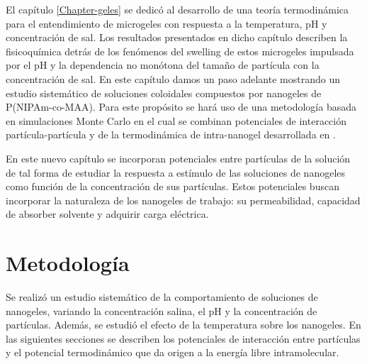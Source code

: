 	El cap\'itulo \ref{Chapter-geles} se dedic\'o al desarrollo de una teor\'ia termodin\'amica para el entendimiento de microgeles con respuesta a la temperatura, pH y concentraci\'on de sal. Los resultados presentados en dicho cap\'itulo describen la fisicoqu\'imica detr\'as de los fen\'omenos del swelling de estos microgeles impulsada por el pH y la dependencia no mon\'otona del tama\~no de part\'icula con la concentraci\'on de sal. 
	En este cap\'itulo damos un paso  adelante mostrando un estudio sistem\'atico de soluciones coloidales compuestos por nanogeles de P(NIPAm-co-MAA). Para este prop\'osito se har\'a uso de una metodolog\'ia basada en simulaciones Monte Carlo en el cual se combinan potenciales de interacci\'on part\'icula-part\'icula y de la termodin\'amica de intra-nanogel desarrollada en \cite{perez2021thermodynamic}. 
	
	
	En este nuevo cap\'itulo se incorporan potenciales entre part\'iculas de la soluci\'on de tal forma de estudiar la respuesta a est\'imulo de las soluciones de nanogeles como funci\'on de la concentraci\'on de sus part\'iculas. Estos potenciales buscan incorporar la naturaleza de los nanogeles de trabajo: su permeabilidad, capacidad de absorber solvente y adquirir carga el\'ectrica.

	
	
	
	
	
	\section{Metodolog\'ia}
	
	Se realiz\'o un estudio sistem\'atico de la comportamiento de soluciones de nanogeles, variando la concentraci\'on salina, el pH y la concentraci\'on de part\'iculas. Adem\'as, se estudi\'o  el efecto de la temperatura sobre los nanogeles. En las siguientes secciones se describen los potenciales de interacci\'on entre part\'iculas y el potencial termodin\'amico que da origen a la energ\'ia libre intramolecular. 
	
